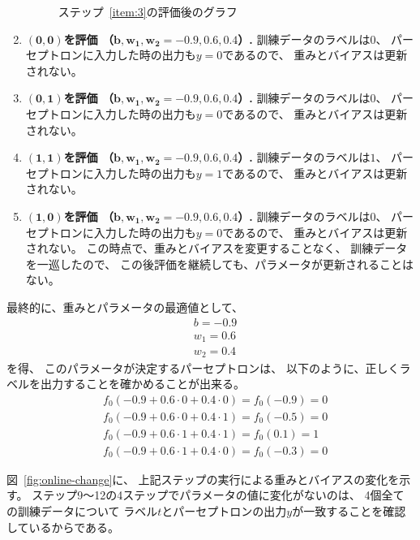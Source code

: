 \begin{enumerate}
\begin{figure}
    \caption{ステップ~\ref{item:3}の評価後のグラフ}
    \label{fig:online-4}
  \end{figure}

\item
  \textbf{$\boldsymbol{(0, 0)}$を評価
    （$\boldsymbol{b, w_1, w_2 = -0.9, 0.6, 0.4}$）. }
  訓練データのラベルは$0$、
  パーセプトロンに入力した時の出力も$y = 0$であるので、
  重みとバイアスは更新されない。
\item
  \textbf{$\boldsymbol{(0, 1)}$を評価
    （$\boldsymbol{b, w_1, w_2 = -0.9, 0.6, 0.4}$）. }
  訓練データのラベルは$0$、
  パーセプトロンに入力した時の出力も$y = 0$であるので、
  重みとバイアスは更新されない。
\item
  \textbf{$\boldsymbol{(1, 1)}$を評価
    （$\boldsymbol{b, w_1, w_2 = -0.9, 0.6, 0.4}$）. }
  訓練データのラベルは$1$、
  パーセプトロンに入力した時の出力も$y = 1$であるので、
  重みとバイアスは更新されない。
\item
  \textbf{$\boldsymbol{(1, 0)}$を評価
    （$\boldsymbol{b, w_1, w_2 = -0.9, 0.6, 0.4}$）. }
  訓練データのラベルは$0$、
  パーセプトロンに入力した時の出力も$y = 0$であるので、
  重みとバイアスは更新されない。
  この時点で、重みとバイアスを変更することなく、
  訓練データを一巡したので、
  この後評価を継続しても、パラメータが更新されることはない。
\end{enumerate}

最終的に、重みとパラメータの最適値として、
\begin{align*}
  &
    b = -0.9
  \\&
  w_1 = 0.6
  \\&
  w_2 = 0.4
\end{align*}
を得、
このパラメータが決定するパーセプトロンは、
以下のように、正しくラベルを出力することを確かめることが出来る。
\begin{align*}
  &
    f_0(-0.9 + 0.6 \cdot 0 + 0.4 \cdot 0) = f_0(-0.9) = 0
  \\&
  f_0(-0.9 + 0.6 \cdot 0 + 0.4 \cdot 1) = f_0(-0.5) = 0
  \\&
  f_0(-0.9 + 0.6 \cdot 1 + 0.4 \cdot 1) = f_0(0.1) = 1
  \\&
  f_0(-0.9 + 0.6 \cdot 1 + 0.4 \cdot 0) = f_0(-0.3) = 0
\end{align*}

図~\ref{fig:online-change}に、
上記ステップの実行による重みとバイアスの変化を示す。
ステップ9〜12の4ステップでパラメータの値に変化がないのは、
4個全ての訓練データについて
ラベル$t$とパーセプトロンの出力$y$が一致することを確認しているからである。

